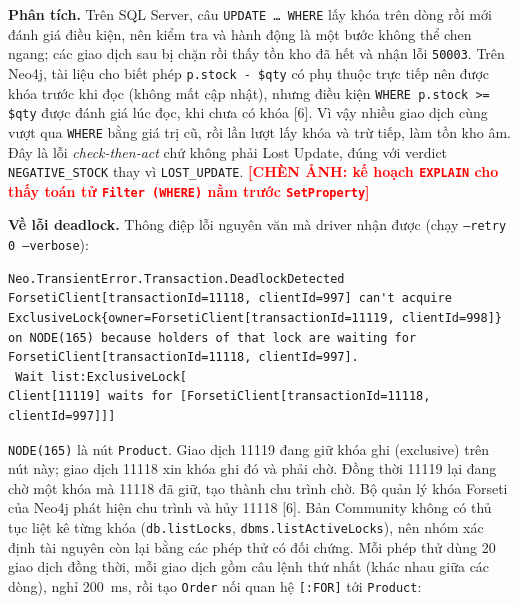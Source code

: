 \textbf{Phân tích.} Trên SQL Server, câu \texttt{UPDATE \ldots{} WHERE} lấy khóa trên dòng rồi mới đánh giá điều kiện, nên kiểm tra và hành động là một bước không thể chen ngang; các giao dịch sau bị chặn rồi thấy tồn kho đã hết và nhận lỗi \texttt{50003}. Trên Neo4j, tài liệu cho biết phép \texttt{p.stock - \$qty} có phụ thuộc trực tiếp nên được khóa trước khi đọc (không mất cập nhật), nhưng điều kiện \texttt{WHERE p.stock >= \$qty} được đánh giá lúc đọc, khi chưa có khóa [6]. Vì vậy nhiều giao dịch cùng vượt qua \texttt{WHERE} bằng giá trị cũ, rồi lần lượt lấy khóa và trừ tiếp, làm tồn kho âm. Đây là lỗi \textit{check-then-act} chứ không phải Lost Update, đúng với verdict \texttt{NEGATIVE\_STOCK} thay vì \texttt{LOST\_UPDATE}. \textcolor{red}{\textbf{[CHÈN ẢNH: kế hoạch \texttt{EXPLAIN} cho thấy toán tử \texttt{Filter (WHERE)} nằm trước \texttt{SetProperty}]}}

\textbf{Về lỗi deadlock.} Thông điệp lỗi nguyên văn mà driver nhận được (chạy \texttt{--retry 0 --verbose}):
\begin{lstlisting}[basicstyle=\ttfamily\footnotesize, breaklines=true, frame=single]
Neo.TransientError.Transaction.DeadlockDetected
ForsetiClient[transactionId=11118, clientId=997] can't acquire ExclusiveLock{owner=ForsetiClient[transactionId=11119, clientId=998]} on NODE(165) because holders of that lock are waiting for ForsetiClient[transactionId=11118, clientId=997].
 Wait list:ExclusiveLock[
Client[11119] waits for [ForsetiClient[transactionId=11118, clientId=997]]]
\end{lstlisting}
\texttt{NODE(165)} là nút \texttt{Product}. Giao dịch 11119 đang giữ khóa ghi (exclusive) trên nút này; giao dịch 11118 xin khóa ghi đó và phải chờ. Đồng thời 11119 lại đang chờ một khóa mà 11118 đã giữ, tạo thành chu trình chờ. Bộ quản lý khóa Forseti của Neo4j phát hiện chu trình và hủy 11118 [6]. Bản Community không có thủ tục liệt kê từng khóa (\texttt{db.listLocks}, \texttt{dbms.listActiveLocks}), nên nhóm xác định tài nguyên còn lại bằng các phép thử có đối chứng. Mỗi phép thử dùng 20 giao dịch đồng thời, mỗi giao dịch gồm câu lệnh thứ nhất (khác nhau giữa các dòng), nghỉ 200~ms, rồi tạo \texttt{Order} nối quan hệ \texttt{[:FOR]} tới \texttt{Product}:

